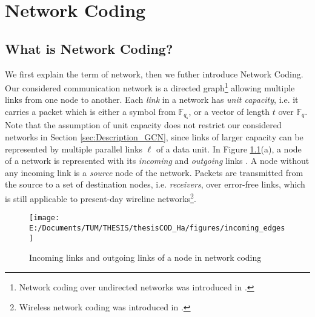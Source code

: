 \chapter{Network Coding} \label{chap:network_coding}

\section{What is Network Coding? \label{sec:What-is-NC}}

We first explain the term of network, then we futher introduce Network
Coding. Our considered communication network is a directed graph\footnote{Network coding over undirected networks was introduced in \cite{Li:2004}.}
allowing multiple links from one node to another. Each \textit{link}
in a network has \textit{unit capacity}, i.e. it carries a packet
which is either a symbol from $\ensuremath{\mathbb{F}}_{q_{\mathrm{s}}}$,
or a vector of length $t$ over $\ensuremath{\mathbb{F}}_{q}$. Note
that the assumption of unit capacity does not restrict our considered
networks in Section \ref{sec:Description_GCN}, since links of larger
capacity can be represented by multiple parallel links $\ell$ of
a data unit. In Figure \ref{fig:incoming_links}(a), a node of a network
is represented with its \textit{incoming} and \textit{outgoing }links
. A node without any incoming link is a \textit{source} node of the
network. Packets are transmitted from the source to a set of destination
nodes, i.e. \textit{receivers}, over error-free links, which is still
applicable to present-day wireline networks\footnote{Wireless network coding was introduced in \cite{Katti:2008}.}.

\begin{figure}[H]
\caption{Incoming links and outgoing links of a node in network coding \label{fig:incoming_links}}

\centering{}\texttt{[image: E:/Documents/TUM/THESIS/thesisCOD\_Ha/figures/incoming\_edges]}
\end{figure}

